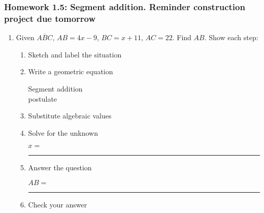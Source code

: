 \documentclass[12pt, oneside]{article}
\begin{document}
\subsubsection*{Homework 1.5: Segment addition. Reminder construction project due tomorrow}
  \begin{enumerate}
    \item Given $\overline{ABC}$, $AB=4x-9$, $BC=x+11$, $AC=22$. Find ${AB}$. Show each step:\\[0.5in]
    \begin{center}
    \end{center}
      \vspace{1cm}
    \begin{enumerate}
      \item Sketch and label the situation
      \item Write a geometric equation\\
      \begin{flushright} Segment addition\\ postulate \end{flushright}
      \item Substitute algebraic values
      \item Solve for the unknown \vspace{3cm}
      \begin{center} $x=$ \rule{1cm}{0.15mm} \end{center}
      \item Answer the question\\
      \begin{center} $AB=$ \rule{1cm}{0.15mm} \end{center}
      \item Check your answer
    \end{enumerate}


  \end{enumerate}

\newpage
\end{document}

